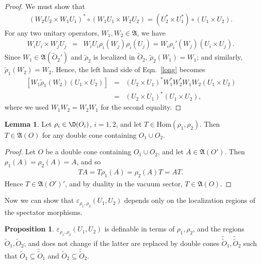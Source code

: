 \documentclass[11pt]{article}
\newcommand{\alg}[1]{\mathfrak{#1}}
\theoremstyle{definition}
\newtheorem{prop}[thm]{Proposition}
\newtheorem{lemma}[thm]{Lemma}
\theoremstyle{definition}
\theoremstyle{remark}
\newcommand{\ve}{\varepsilon}
\def\wt#1{{\tilde #1}}
\newcommand{\Hom}{\mathrm{Hom}}
\begin{document}
\begin{proof} We must show that
  \begin{eqnarray} (W_2U_2\times W_1U_1)^*\circ (W_1U_1\times W_2U_2) = (U_2^*\times
    U_1^*)\circ (U_1\times U_2) .\label{long} \end{eqnarray} For any two unitary
  operators, $W_1,W_2\in \alg{A}$, we have
\begin{eqnarray*} W_iU_i\times W_jU_j &=& W_iU_i\rho _i(W_j)\rho _i(U_j) = W_i\rho
  _i'(W_j)(U_i\times U_j) .\end{eqnarray*} Since $W_1\in \alg{A}({{\wt O}_2}')$ and $\wt
\rho _2$ is localized in $\wt O_2$, $\wt \rho _2(W_1)=W_1$; and similarly, $\wt \rho
_1(W_2)=W_2$.  Hence, the left hand side of Eqn.\ \ref{long} becomes
\begin{eqnarray*}
  [(U_2\times U_1)^*\wt \rho _2(W_1^*)W_2^*]\, [W_1\wt \rho _1(W_2)(U_1\times U_2)]  &=& (U_2\times U_1)^*W_1^*W_2^*W_1W_2(U_1\times U_2) \\
  &=& (U_2\times U_1)^*(U_1\times U_2) ,\end{eqnarray*} where we used $W_1W_2=W_2W_1$
for the second equality. \end{proof}

\newcommand{\dt}[1]{\tilde{\tilde{#1}}}

\begin{lemma} Let $\rho _i\in \D (O_i)$, $i=1,2$, and let $T\in \Hom (\rho _1,\rho
  _2)$.  Then $T\in \alg{A}(O)$ for any double cone containing $O_1\cup O_2$.
  \label{hom-loc}
\end{lemma}

\begin{proof} Let $O$ be a double cone containing $O_1\cup O_2$, and let $A\in
  \alg{A}(O')$.  Then $\rho _1(A)=\rho _2(A)=A$, and so
  \begin{eqnarray*} TA=T\rho _1(A)=\rho _2(A)T =AT .\end{eqnarray*} Hence $T\in
  \alg{A}(O')'$, and by duality in the vacuum sector, $T\in \alg{A}(O)$. \end{proof}

Now we can show that $\ve _{\rho _1,\rho _2}(U_1,U_2)$ depends only on the
localization regions of the spectator morphisms.

\begin{prop} $\ve _{\rho _1,\rho _2}(U_1,U_2)$ is definable in terms of $\rho _1
  ,\rho _2$, and the regions $\wt O_1,\wt O_2$; and does not change if the latter are
  replaced by double cones $\dt{O}_1,\dt{O}_2$ such that $\wt O_1\subseteq \dt{O}_1$
  and $\wt O_2\subseteq \dt{O}_2$. \label{perturb}
\end{prop}
\end{document}
